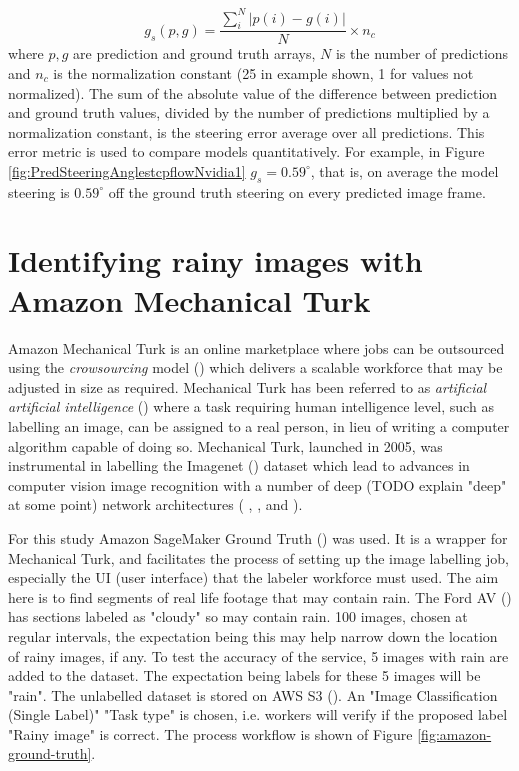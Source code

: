 \begin{equation}
    \label{eq:goodness_of_steer}
    g_s(p,g) = \frac{\sum_i^N \lvert p(i)-g(i) \rvert }{N} \times n_c
\end{equation}
where $p,g$ are prediction and ground truth arrays,  $N$ is the number of predictions and $n_c$ is the normalization constant (25 in example shown, 1 for values not normalized). The sum of the absolute value of the difference between prediction and ground truth values, divided by the number of predictions multiplied by a normalization constant, is the steering error average over all predictions. This error metric is used to compare models quantitatively. For example, in Figure \ref{fig:PredSteeringAnglestcpflowNvidia1} $g_s = 0.59^{\circ}$, that is, on average the model steering is $0.59^{\circ}$ off the ground truth steering on every predicted image frame. 

\section{Identifying rainy images with Amazon Mechanical Turk}

Amazon Mechanical Turk \cite{crowston2012amazon} is an online marketplace where jobs can be outsourced using the \textit{crowsourcing} model  (\cite{vukovic2009crowdsourcing}) which delivers a scalable workforce that may be adjusted in size as required. Mechanical Turk has been referred to as \textit{artificial artificial intelligence} (\cite{dai2011artificial}) where a task requiring human intelligence level, such as labelling an image, can be assigned to a real person, in lieu of writing  a computer algorithm capable of doing so. Mechanical Turk, launched in 2005, was instrumental in labelling the Imagenet (\cite{deng2009imagenet}) dataset which lead to advances in computer vision image recognition with a number of deep (TODO explain "deep" at some point) network architectures ( \cite{krizhevsky2012imagenet}, \cite{he2015deep}, \cite{szegedy2014going} and \cite{simonyan2015deep}). 

For this study Amazon SageMaker Ground Truth (\cite{SageMakerGroundTruthDocumentation2020}) was used. It is a wrapper for Mechanical Turk, and facilitates the process of setting up the image labelling job, especially the UI (user interface) that the labeler workforce must used.  
The aim here is to find segments of real life footage that may contain rain. The Ford AV (\cite{agarwal2020ford}) has sections labeled as "cloudy" so may contain rain. 100 images, chosen at regular intervals, the expectation being this may help narrow down the location of rainy images, if any. To test the accuracy of the service, 5 images with rain are added to the dataset. The expectation being labels for these 5 images will be "rain". 
The unlabelled dataset is stored on AWS S3 (\cite{AmazonS3Documentation2020}). An "Image Classification (Single Label)" "Task type" is chosen, i.e. workers will verify if the proposed label "Rainy image" is correct. The process workflow is shown of Figure \ref{fig:amazon-ground-truth}.

